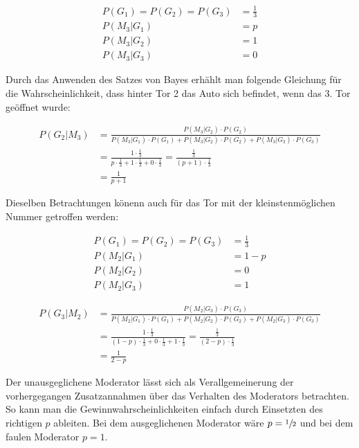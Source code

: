 \begin{equation}
    \begin{split}
        P(G_1) = P(G_2)  = P(G_3) &= \frac{1}{3} \\
        P(M_3 | G_1) & = p \\
        P(M_3 | G_2) & = 1 \\
        P(M_3 | G_3) & = 0
    \end{split}
\end{equation}

Durch das Anwenden des Satzes von Bayes erhählt man folgende Gleichung für die Wahrscheinlichkeit, dass hinter Tor 2 das Auto sich befindet, wenn das 3. Tor geöffnet wurde:

\begin{equation}
    \begin{split}
        P(G_2 | M_3) & = \frac{P(M_3 | G_2) \cdot P(G_2)}{P(M_3 | G_1) \cdot P(G_1) +
            P(M_3 | G_2) \cdot P(G_2) + P(M_3 | G_3) \cdot P(G_3)} \\
        & = \frac{1 \cdot \frac{1}{3}}{p \cdot \frac{1}{3} + 1 \cdot \frac{1}{3} + 0 \cdot \frac{1}{3}} = \frac{\frac{1}{3}}{(p+1) \cdot \frac{1}{3} } \\
        & = \frac{1}{p+1}
    \end{split}
\end{equation}

Dieselben Betrachtungen könenn auch für das Tor mit der kleinstenmöglichen Nummer getroffen werden:

\begin{equation}
    \begin{split}
        P(G_1) = P(G_2)  = P(G_3) &= \frac{1}{3} \\
        P(M_2 | G_1) & = 1 - p \\
        P(M_2 | G_2) & = 0 \\
        P(M_2 | G_3) & = 1
    \end{split}
\end{equation}

\begin{equation}
    \begin{split}
        P(G_3 | M_2) & = \frac{P(M_2 | G_3) \cdot P(G_3)}{P(M_2 | G_1) \cdot P(G_1) +
            P(M_2 | G_2) \cdot P(G_2) + P(M_2 | G_3) \cdot P(G_3)} \\
        & = \frac{1 \cdot \frac{1}{3}}{(1-p) \cdot \frac{1}{3} + 0 \cdot \frac{1}{3} + 1 \cdot \frac{1}{3}} = \frac{\frac{1}{3}}{(2-p) \cdot \frac{1}{3} } \\
        & = \frac{1}{2-p}
    \end{split}
\end{equation}


Der unausgeglichene Moderator lässt sich als Verallgemeinerung der vorhergegangen Zusatzannahmen über das Verhalten des Moderators betrachten. So kann man die Gewinnwahrscheinlichkeiten einfach durch Einsetzten des richtigen $p$ ableiten.
Bei dem ausgeglichenen Moderator wäre $p = \sfrac{1}{2}$ und bei dem faulen Moderator $p = 1$.